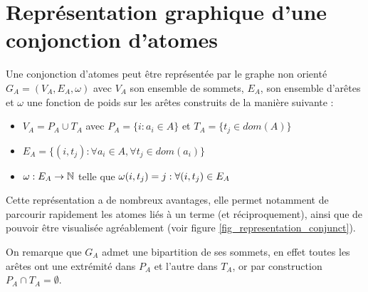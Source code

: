 \section{Représentation graphique d'une conjonction d'atomes}
\label{def_representation_conjonction}
Une conjonction d'atomes 
peut \^etre repr\'esent\'ee par le graphe non orient\'e $G_{A} = (V_{A},E_{A},\omega)$
avec $V_{A}$ son ensemble de sommets, $E_{A}$,
son ensemble d'ar\^etes et $\omega$ une fonction de poids sur les ar\^etes construits de la mani\`ere suivante :
\begin{itemize}
	\item $V_{A} = P_{A} \cup T_{A}$ avec $P_{A} = \{i : a_{i} \in A\}$ et 
	$T_{A} = \{t_{j} \in dom(A)\}$
	\item $E_{A} = \{(i,t_{j}) : \forall a_{i} \in A, \forall t_{j} \in dom(a_{i})\}$
	\item $\omega : E_A \rightarrow \mathbb{N}$ telle que
	$\omega(i,t_{j}) = j : \forall (i,t_{j}) \in E_{A}\\$
\end{itemize}

Cette représentation a de nombreux avantages, elle permet notamment de parcourir
rapidement les atomes liés à un terme (et réciproquement), ainsi que de pouvoir être
visualisée agréablement (voir figure \ref{fig_representation_conjunct}).


On remarque que %
	$G_{A}$ admet une bipartition de ses sommets, en effet toutes les ar\^etes ont 
	une extr\'emit\'e dans $P_{A}$ et l'autre dans $T_{A}$, or par construction $P_{A} 
	\cap T_{A} = \emptyset$.


